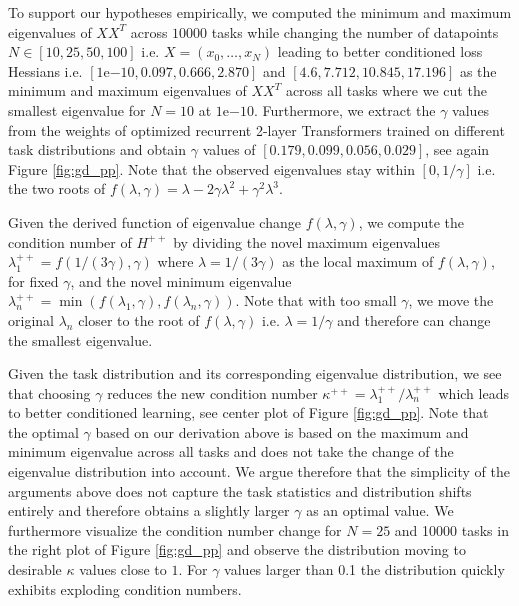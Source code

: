 \documentclass{article}
\theoremstyle{plain}
\theoremstyle{definition}
\theoremstyle{remark}
\begin{document}
To support our hypotheses empirically, we computed the minimum and maximum eigenvalues of $XX^T$ across $10000$ tasks while changing the number of datapoints $N \in [10, 25, 50, 100]$ i.e. $X=(x_0, \dots, x_N)$ leading to better conditioned loss Hessians i.e. $[1\mathrm{e}{-10}, 0.097, 0.666, 2.870]$ and $[4.6, 7.712, 10.845, 17.196]$ as the minimum and maximum eigenvalues of $XX^T$ across all tasks where we cut the smallest eigenvalue for $N=10$ at $1\mathrm{e}{-10}$.
Furthermore, we extract the $\gamma$ values from the weights of optimized recurrent 2-layer Transformers trained on different task distributions and obtain $\gamma$ values of $[0.179, 0.099, 0.056, 0.029]$, see again Figure \ref{fig:gd_pp}. Note that the observed eigenvalues stay within $[0, 1/\gamma]$ i.e. the two roots of $f(\lambda, \gamma) = \lambda - 2\gamma \lambda^2 + \gamma^2 \lambda^3$.

Given the derived function of eigenvalue change $f(\lambda, \gamma)$, we compute the condition number of $H^{++}$ by dividing the novel maximum eigenvalues $\lambda_1^{++} = f(1/(3\gamma), \gamma)$ where $\lambda = 1/(3\gamma)$ as the local maximum of $f(\lambda, \gamma)$, for fixed $\gamma$, and the novel minimum eigenvalue $\lambda_n^{++} = \min (f(\lambda_1, \gamma),f(\lambda_n, \gamma))$. Note that with too small $\gamma$, we move the original $\lambda_n$ closer to the root of $f(\lambda, \gamma)$ i.e. $\lambda = 1/\gamma$  and therefore can change the smallest eigenvalue. 

Given the task distribution and its corresponding eigenvalue distribution, we see that choosing $\gamma$ reduces the new condition number $\kappa^{++} = \lambda_1^{++}/\lambda_n^{++}$ which leads to better conditioned learning, see center plot of Figure \ref{fig:gd_pp}. Note that the optimal $\gamma$ based on our derivation above is based on the maximum and minimum eigenvalue across all tasks and does not take the change of the eigenvalue distribution into account. We argue therefore that the simplicity of the arguments above does not capture the task statistics and distribution shifts entirely and therefore obtains a slightly larger $\gamma$ as an optimal value. We furthermore visualize the condition number change for $N=25$ and 10000 tasks in the right plot of Figure \ref{fig:gd_pp} and observe the distribution moving to desirable $\kappa$ values close to $1$. For $\gamma$ values larger than 0.1 the distribution quickly exhibits exploding condition numbers. 
\end{document}
